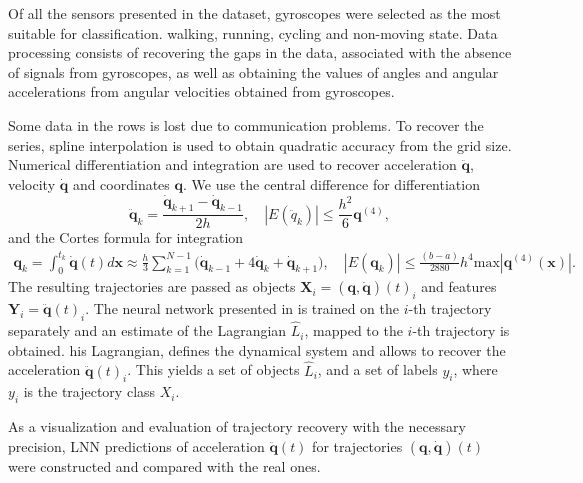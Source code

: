 \documentclass[12pt]{paper}
\begin{document}
Of all the sensors presented in the dataset, gyroscopes were selected as the most suitable for classification. walking, running, cycling and non-moving state. Data processing consists of recovering the gaps in the data, associated with the absence of signals from gyroscopes, as well as obtaining the values of
angles and angular accelerations from angular velocities obtained from gyroscopes.

Some data in the rows is lost due to communication problems. To recover the series, spline interpolation is used to obtain quadratic accuracy from the grid size. Numerical differentiation and integration are used to recover acceleration $\ddot{\mathbf{q}}$, velocity $\dot{\mathbf{q}}$ and coordinates $\mathbf{q}$. We use the central difference for differentiation
\[
\ddot{\mathbf{q}}_k =\frac{\dot{\mathbf{q}}_{k+1} - \dot{\mathbf{q}}_{k-1}}{2h},
\quad
\left|E(\ddot{q}_k)\right|\le \frac{h^2}{6}\mathbf{q}^{(4)},
\]
and the Cortes formula for integration 
\[
\begin{split}
\mathbf{q}_k = \int_{0}^{t_k}{\dot{\mathbf{q}}(t)d\mathbf{x}}\approx\frac{h}{3}\sum_{k=1}^{N-1}{\Big(\dot{\mathbf{q}}_{k-1}+4\dot{\mathbf{q}}_k+\dot{\mathbf{q}}_{k+1}\Big)},
\quad
\left|E(\mathbf{q}_k)\right| \le \frac{(b-a)}{2880}h^4\text{max}\left|\mathbf{q}^{(4)}\left(\mathbf{x}\right)\right|.
\end{split}
\]
The resulting trajectories are passed as objects $\mathbf{X}_i = (\mathbf{q},\dot{\mathbf{q}})(t)_i$ and features $\mathbf{Y}_i = \ddot{\mathbf{q}}(t)_i$. The neural network presented in \cite{article} is trained on the $i$-th trajectory separately and an estimate of the Lagrangian $\hat{L}_i$, mapped to the $i$-th trajectory is obtained. his Lagrangian, defines the dynamical system and allows to recover the acceleration $\ddot{\mathbf{q}}(t)_i$. This yields a set of objects $\hat{L}_i$, and a set of labels $y_i$, where $y_i$ is the trajectory class $X_i$.


As a visualization and evaluation of trajectory recovery with the necessary precision, LNN predictions of acceleration $\ddot{\mathbf{q}}(t)$ for trajectories $(\mathbf{q}, \dot{\mathbf{q}})(t)$ were constructed
and compared with the real ones.
\end{document}
